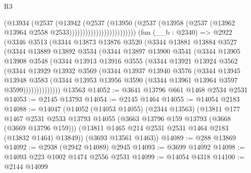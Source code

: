 \begin{lexlean}{R3}
\begin{coremodule}
                                    (@13934
                                      (@2537
                                        (@13942
                                          (@2537
                                            (@13950
                                              (@2537
                                                (@13958
                                                  (@2537
                                                    (@13962
                                                      @13964
                                                      @2558
                                                      @2533)))))))))))))))))))))))))
    (fun (__b : @2340) =>
    @2922
      (@3346
        @3513
        (@3344
          @13873
          @13876
          @3520
          (@3344
            @13881
            @13884
            @3527
            (@3344
              @13889
              @13892
              @3534
              (@3344
                @13897
                @13900
                @3541
                (@3344
                  @13905
                  @13908
                  @3548
                  (@3344
                    @13913
                    @13916
                    @3555
                    (@3344
                      @13921
                      @13924
                      @3562
                      (@3344
                        @13929
                        @13932
                        @3569
                        (@3344
                          @13937
                          @13940
                          @3576
                          (@3344
                            @13945
                            @13948
                            @3583
                            (@3344
                              @13953
                              @13956
                              @3590
                              (@3344 @13961 @13964 @3597 @3599))))))))))))))
    @13563
@14052 := @3641 @13796 @661 @1468 @2534 @2531
@14053 := @2145 @13793
@14054 := @2145 @1464
@14055 := @14054 @2183
@14088 := @14047
    (@14052
      (@14053 @14055)
      (@2344 @13563)
      (@13811
        @177
        @1467
        @2531
        @2533
        @13793
        @14055
        (@3663 @13796 @159 @13793 (@3668 (@3669 @13796 @159)))
        (@13811 @1465 @214 @2531 @2531 @1464 @2183 (@13832 @1464) @13849))
      (@3693 @13561 @1463))
@14089 := @288 @13869
@14092 := @2938 (@2942 @14089) @2945
@14093 := @3699 @14092
@14098 := @14093 @223 @1002 @1474 @2556 @2531
@14099 := @14054 @4318
@14100 := @2144 @14099

\end{coremodule}
\end{lexlean}
